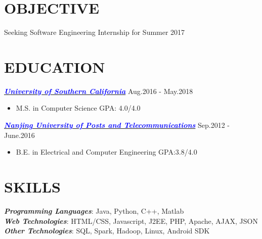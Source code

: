 \documentclass[line,margin]{res}
\begin{document}
\address{Address: 325 W. Adams Blvd 4105, Los Angeles CA 90007 \quad \quad Email: \href{mailto:chen147@usc.edu}{\textcolor{blue}{chen147@usc.edu}}}
\address{\hspace{101mm} Phone: (213) 479-3339}

\begin{resume}
\vspace{-2mm}
\section{OBJECTIVE}
	Seeking Software Engineering Internship for Summer 2017
\vspace{-1.5mm}
\section{EDUCATION}
                {\sl \href{http://www.usc.edu/}{\textcolor{blue}{\textbf{University of Southern California}}}}  \hfill Aug.2016 - May.2018
                    \begin{itemize}
                    \item M.S. in Computer Science \quad GPA: 4.0/4.0
                    \end{itemize}
                \vspace{-2mm}
                {\sl \href{http://www.njupt.edu.cn/}{\textcolor{blue}{\textbf{Nanjing University of Posts and Telecommunications}}}}  \hfill Sep.2012 - June.2016
                 \begin{itemize}
                   \item B.E. in Electrical and Computer Engineering \quad GPA:3.8/4.0                 \end{itemize}

\vspace{-2.5mm}

\section{SKILLS}
            {\sl \textbf{Programming Languages}}: Java, Python, C++, Matlab\\
            {\sl \textbf{Web Technologies}}: HTML/CSS, Javascript, J2EE, PHP, Apache, AJAX, JSON \\
            {\sl \textbf{Other Technologies}}: SQL, Spark, Hadoop, Linux, Android SDK\\
\vspace{-2.5mm}


\end{resume}
\end{document}
